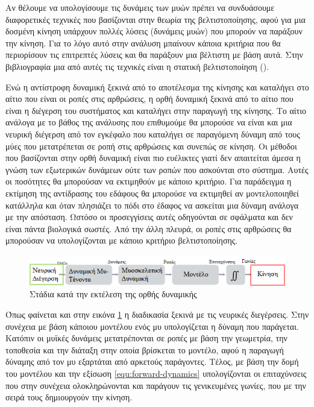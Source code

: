 Αν θέλουμε να υπολογίσουμε τις δυνάμεις των μυών πρέπει να συνδυάσουμε διαφορετικές τεχνικές που βασίζονται στην θεωρία της βελτιστοποίησης, αφού για μια δοσμένη κίνηση υπάρχουν πολλές λύσεις (δυνάμεις μυών) που μπορούν να παράξουν την κίνηση. Για το λόγο αυτό στην ανάλυση μπαίνουν κάποια κριτήρια που θα περιορίσουν τις επιτρεπτές λύσεις και θα παράξουν μια βέλτιστη με βάση αυτά. Στην βιβλιογραφία μια από αυτές τις τεχνικές είναι η στατική βελτιστοποίηση ().

Ενώ η αντίστροφη δυναμική ξεκινά από το αποτέλεσμα της κίνησης και καταλήγει στο αίτιο που είναι οι ροπές στις αρθρώσεις, η ορθή δυναμική ξεκινά από το αίτιο που είναι η διέγερση του συστήματος και καταλήγει στην παραγωγή της κίνησης. Το αίτιο ανάλογα με το βάθος της ανάλυσης που επιθυμούμε θα μπορούσε να είναι και μια νευρική διέγερση από τον εγκέφαλο που καταλήγει σε παραγόμενη δύναμη από τους μύες που μετατρέπεται σε ροπή στις αρθρώσεις και συνεπώς σε κίνηση. Οι μέθοδοι που βασίζονται στην ορθή δυναμική είναι πιο ευέλικτες γιατί δεν απαιτείται άμεσα η γνώση των εξωτερικών δυνάμεων ούτε των ροπών που ασκούνται στο σύστημα. Αυτές οι ποσότητες θα μπορούσαν να εκτιμηθούν με κάποιο κριτήριο. Για παράδειγμα η εκτίμηση της αντίδρασης του εδάφους θα μπορούσε να εκτιμηθεί αν μοντελοποιηθεί κατάλληλα και όταν πλησιάζει το πόδι στο έδαφος να ασκείται μια δύναμη ανάλογα με την απόσταση. Ωστόσο οι προσεγγίσεις αυτές οδηγούνται σε σφάλματα και δεν είναι πάντα βιολογικά σωστές. Από την άλλη πλευρά, οι ροπές στις αρθρώσεις θα μπορούσαν να υπολογίζονται με κάποιο κριτήριο βελτιστοποίησης.

\begin{figure}[H]
    \centering
    \includegraphics[width=1.0\textwidth, keepaspectratio]{fig/forward-simulation.png}
    \caption{Στάδια κατά την εκτέλεση της ορθής δυναμικής\protect\footnotemark}
    \label{fig:forward-simulation}
\end{figure}

Όπως φαίνεται και στην εικόνα \ref{fig:forward-simulation} η διαδικασία ξεκινά με τις νευρικές διεγέρσεις. Στην συνέχεια με βάση κάποιου μοντέλου ενός μυ υπολογίζεται η δύναμη που παράγεται. Κατόπιν οι μυϊκές δυνάμεις μετατρέπονται σε ροπές με βάση την γεωμετρία, την τοποθεσία και την διάταξη στην οποία βρίσκεται το μοντέλο, αφού η παραγωγή δύναμης από τον μυ εξαρτάται από αρκετούς παράγοντες. Τέλος, με βάση την δομή του μοντέλου και την εξίσωση \ref{equ:forward-dynamics} υπολογίζονται οι επιταχύνσεις που στην συνέχεια ολοκληρώνονται και παράγουν τις γενικευμένες γωνίες, που με την σειρά τους δημιουργούν την κίνηση.

